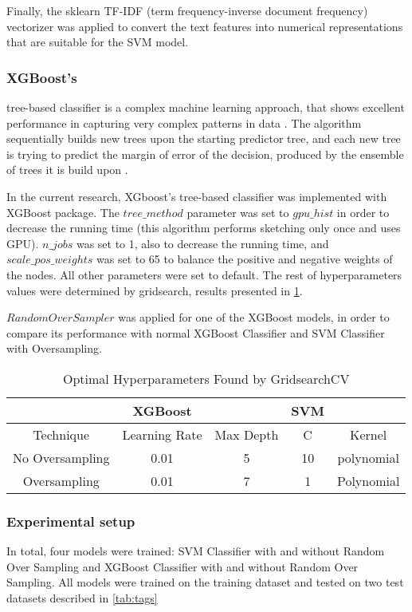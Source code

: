 
Finally, the sklearn \cite{scikit-learn} TF-IDF (term frequency-inverse document frequency) vectorizer was applied to convert the text features into numerical representations that are suitable for the SVM model. 
 
\subsubsection{XGBoost's} tree-based classifier is a complex machine learning approach, that shows excellent performance in capturing very complex patterns in data \cite{minasny2009elements}. The algorithm sequentially builds new trees upon the starting predictor tree, and each new tree is trying to predict the margin of error of the decision, produced by the ensemble of trees it is build upon \cite{minasny2009elements}.

In the current research, XGboost's tree-based classifier was implemented with XGBoost package. The $tree\_method$ parameter was set to $gpu\_hist$ in order to decrease the running time (this algorithm performs sketching only once and uses GPU). $n\_jobs$ was set to 1, also to decrease the running time, and $scale\_pos\_weights$ was set to 65 to balance the positive and negative weights of the nodes. All other parameters were set to default. The rest of hyperparameters values were determined by gridsearch, results presented in \ref{tab: Optimal params}.

$RandomOverSampler$ was applied for one of the XGBoost models, in order to compare its performance with normal XGBoost Classifier and SVM Classifier with Oversampling.

\begin{table}[!h]
\centering
\begin{tabular}{ccccc}
 & XGBoost &  & SVM &  \\ \hline
\multicolumn{1}{c|}{Technique} & Learning Rate & \multicolumn{1}{c|}{Max Depth} & C & Kernel \\ \hline
\multicolumn{1}{c|}{No Oversampling} & 0.01 & \multicolumn{1}{c|}{5} & 10 & polynomial \\
\multicolumn{1}{c|}{Oversampling} & 0.01 & \multicolumn{1}{c|}{7} & 1 & Polynomial \\ \hline
\end{tabular}
\caption{Optimal Hyperparameters Found by GridsearchCV}
\label{tab: Optimal params}
\end{table}

\subsubsection*{Experimental setup}
In total, four models were trained: SVM Classifier with and without Random Over Sampling and XGBoost Classifier with and without Random Over Sampling. All models were trained on the training dataset and tested on two test datasets described in \ref{tab:tags}
